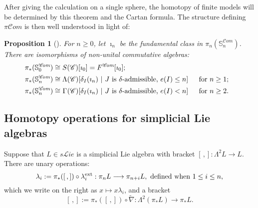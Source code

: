 \documentclass[11pt]{amsart} \renewcommand{\baselinestretch}{1.4}
\theoremstyle{plain}
\newtheorem{prop}[thm]{Proposition}
\theoremstyle{definition}
\renewcommand{\to}{\longrightarrow}
\newcommand{\scrL}{\mathscr{L}}
\newcommand{\scrC}{\mathscr{C}}
\newcommand{\CommOperad}{{\scrC}}
\newcommand{\PA}[1]{\pi#1}
\newcommand{\algs}{{\scrC\!\textit{om}}}
\newcommand{\liealgs}{{\scrL\!\textit{ie}}}
\renewcommand{\mapsto}{\longmapsto}
\begin{document}
\begin{Constructing homotopy operations}
\noindent After giving the calculation on a single sphere, the homotopy of finite models will be determined by this theorem and the Cartan formula. The structure defining $\PA{\algs}$ is then well understood in light of:
\begin{prop}[{\cite[Proposition 2.7]{MR1089001}}]
\label{homotopy of comm alg sphere}
\noindent For $n\geq0$, let $\imath_n$ be the fundamental class in $\pi_n(\mathbb{S}^\algs_n)$. There  are isomorphisms of non-unital commutative algebras:
\begin{alignat*}{2}
\pi_*(\mathbb{S}^\algs_0)
&\cong
S(\CommOperad)[\imath_0]=F^{\algs}[\imath_0];%
\\
\pi_*(\mathbb{S}^\algs_n)
&\cong
\makebox[\widthof{$\Lambda$}][c]{$\Lambda$}(\CommOperad)[\delta_I(\imath_n)\ |\ \textup{$J$ is $\delta$-admissible, $e(I)\leq n$}]%
&\ \ &\makebox[\widthof{for $n\geq1$}][c]{for $n\geq1$;}\\
\pi_*(\mathbb{S}^\algs_n)
&\cong
\makebox[\widthof{$\Lambda$}][c]{$\Gamma$}(\CommOperad)[\delta_I(\imath_n)\ |\ \textup{$J$ is $\delta$-admissible, $e(I)< n$}]%
&\ \ &\makebox[\widthof{for $n\geq1$}][c]{for $n\geq2$.}%
\end{alignat*}
\end{prop}

\subsection{Homotopy operations for simplicial Lie algebras}\label{Homotopy operations for simplicial Lie algebras}
Suppose that $L\in s \liealgs$ is a simplicial Lie algebra with bracket $[\,,]:\Lambda^2L\to L$. There are unary operations:
\[\lambda_i:=\pi_*([\,,])\circ\lambda_i^\textup{ext}:\pi_nL\to \pi_{n+i}L,\textup{ defined when }1\leq i\leq n,\]
which we write on the right as $x\mapsto x\lambda_i$, and a bracket
\[[\,,]:=\pi_*([\,,])\circ\widetilde{\nabla}:\Lambda^2(\pi_*L)\to \pi_{*}L.\]


\end{Constructing homotopy operations}
\end{document}
